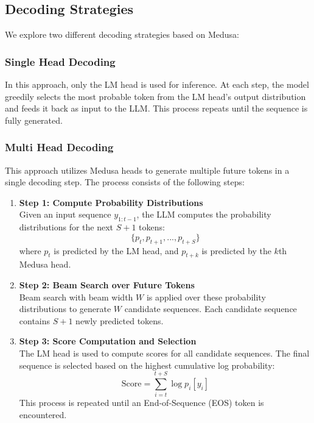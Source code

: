 \documentclass[12pt]{article}
\begin{document}
\subsection{Decoding Strategies}

We explore two different decoding strategies based on Medusa:

\subsubsection{Single Head Decoding}
In this approach, only the LM head is used for inference. At each step, the model greedily selects the most probable token from the LM head’s output distribution and feeds it back as input to the LLM. This process repeats until the sequence is fully generated.

\subsubsection{Multi Head Decoding}
This approach utilizes Medusa heads to generate multiple future tokens in a single decoding step. The process consists of the following steps:

\begin{enumerate}
    \item \textbf{Step 1: Compute Probability Distributions} \\
    Given an input sequence $y_{1:t-1}$, the LLM computes the probability distributions for the next $S+1$ tokens:
    \begin{equation}
        \{p_t, p_{t+1}, ..., p_{t+S}\}
    \end{equation}
    where $p_t$ is predicted by the LM head, and $p_{t+k}$ is predicted by the $k$th Medusa head.
    
    \item \textbf{Step 2: Beam Search over Future Tokens} \\
    Beam search with beam width $W$ is applied over these probability distributions to generate $W$ candidate sequences. Each candidate sequence contains $S+1$ newly predicted tokens. 
    \item \textbf{Step 3: Score Computation and Selection} \\
    The LM head is used to compute scores for all candidate sequences. The final sequence is selected based on the highest cumulative log probability:
    \begin{equation}
        \text{Score} = \sum_{i=t}^{t+S} \log p_i[y_i]
    \end{equation}
    This process is repeated until an End-of-Sequence (EOS) token is encountered.
\end{enumerate}
\end{document}
